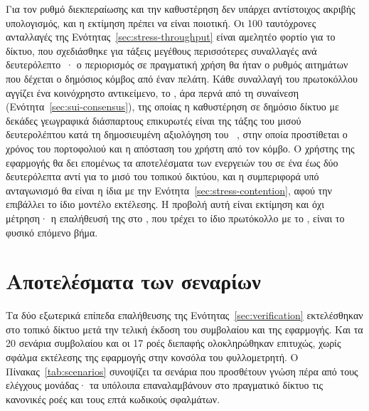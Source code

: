 Για τον ρυθμό διεκπεραίωσης και την καθυστέρηση δεν υπάρχει αντίστοιχος ακριβής
υπολογισμός, και η εκτίμηση πρέπει να είναι ποιοτική. Οι 100 ταυτόχρονες ανταλλαγές της
Ενότητας~\ref{sec:stress-throughput} είναι αμελητέο φορτίο για το δίκτυο, που σχεδιάσθηκε
για τάξεις μεγέθους περισσότερες συναλλαγές ανά δευτερόλεπτο~\cite{sui-whitepaper,
mysticeti2023}· ο περιορισμός σε πραγματική χρήση θα ήταν ο ρυθμός αιτημάτων που δέχεται
ο δημόσιος κόμβος από έναν πελάτη. Κάθε συναλλαγή του πρωτοκόλλου αγγίζει ένα
κοινόχρηστο αντικείμενο, το , άρα περνά από τη συναίνεση
(Ενότητα~\ref{sec:sui-consensus}), της οποίας η καθυστέρηση σε δημόσιο δίκτυο με δεκάδες
γεωγραφικά διάσπαρτους επικυρωτές είναι της τάξης του μισού δευτερολέπτου κατά τη
δημοσιευμένη αξιολόγηση του ~\cite{mysticeti2023}, στην οποία προστίθεται
ο χρόνος του πορτοφολιού και η απόσταση του χρήστη από τον κόμβο. Ο χρήστης της
εφαρμογής θα δει επομένως τα αποτελέσματα των ενεργειών του σε ένα έως δύο δευτερόλεπτα
αντί για το μισό του τοπικού δικτύου, και η συμπεριφορά υπό ανταγωνισμό θα είναι η ίδια
με την Ενότητα~\ref{sec:stress-contention}, αφού την επιβάλλει το ίδιο μοντέλο εκτέλεσης.
Η προβολή αυτή είναι εκτίμηση και όχι μέτρηση· η επαλήθευσή της στο , που
τρέχει το ίδιο πρωτόκολλο με το , είναι το φυσικό επόμενο βήμα.

\section{Αποτελέσματα των σεναρίων}
\label{sec:scenario-results}

Τα δύο εξωτερικά επίπεδα επαλήθευσης της Ενότητας~\ref{sec:verification} εκτελέσθηκαν
στο τοπικό δίκτυο μετά την τελική έκδοση του συμβολαίου και της εφαρμογής. Και τα 20
σενάρια συμβολαίου και οι 17 ροές διεπαφής ολοκληρώθηκαν επιτυχώς, χωρίς σφάλμα
εκτέλεσης της εφαρμογής στην κονσόλα του φυλλομετρητή. Ο
Πίνακας~\ref{tab:scenarios} συνοψίζει τα σενάρια που προσθέτουν γνώση πέρα από τους
ελέγχους μονάδας· τα υπόλοιπα επαναλαμβάνουν στο πραγματικό δίκτυο τις κανονικές ροές
και τους επτά κωδικούς σφαλμάτων.

